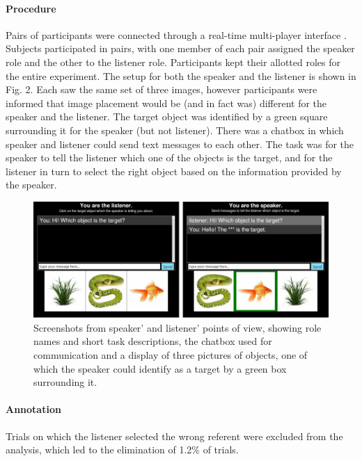 \documentclass[10pt,letterpaper]{article}
\begin{document}
\paragraph{\bf Procedure}
Pairs of participants were connected through a real-time multi-player interface \cite{Hawkins15_RealTimeWebExperiments}. Subjects participated in pairs, with one member of each pair assigned the speaker role and the other to the listener role. Participants kept their allotted roles for the entire experiment. 
The setup for both the speaker and the listener is shown in Fig. 2. Each saw the same set of three images, however participants were informed that image placement would be (and in fact was) different for the speaker and the listener. The target object was identified by a green square surrounding it for the speaker (but not listener). There was a chatbox in which speaker and listener could send text messages to each other. The task was for the speaker to tell the listener which one of the objects is the target, and for the listener in turn to select the right object based on the information provided by the speaker. 

\begin{figure}[ht!]
\centering
\includegraphics[width=.5\textwidth]{graphs/procedure}
\caption{Screenshots from speaker' and listener' points of view, showing role names and short task descriptions, the chatbox used for communication and a display of three pictures of objects, one of which the speaker could identify as a target by a green box surrounding it.}
\label{fig:procedure}
\end{figure}

\paragraph{\bf Annotation}
Trials on which the listener selected the wrong referent were excluded from the analysis, which led to the elimination of 1.2\% of trials.
 
\end{document}
